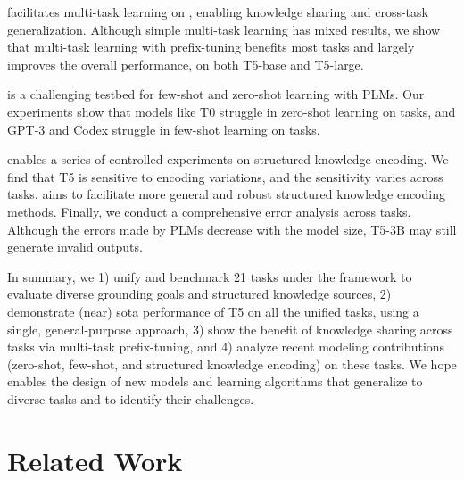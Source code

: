 \uskg facilitates multi-task learning on \skg, enabling knowledge sharing and cross-task generalization. 
Although simple multi-task learning has mixed results, we show that multi-task learning with prefix-tuning \citep{li2021prefixtuning} benefits most tasks and largely improves the overall performance, on both T5-base and T5-large.

\uskg is a challenging testbed for few-shot \cite{brown2020language,Ye2021CrossFitAF} and zero-shot learning \cite{Zhong2021AdaptingLM,Jason2021,sanh2021multitask} with PLMs.
Our experiments show that models like T0 \cite{sanh2021multitask} struggle in zero-shot learning on \skg tasks, and GPT-3 \cite{brown2020language} and Codex \cite{chen2021evaluating} struggle in few-shot learning on \skg tasks.

\uskg enables a series of controlled experiments on structured knowledge encoding.
We find that T5 is sensitive to encoding variations, and the sensitivity varies across tasks.
\uskg aims to facilitate more general and robust structured knowledge encoding methods. 
Finally, we conduct a comprehensive error analysis across \skg tasks.
Although the errors made by PLMs decrease with the model size, T5-3B may still generate invalid outputs. 

In summary, we 1) unify and benchmark 21 \skg tasks under the \uskg framework to evaluate diverse grounding goals and structured knowledge sources, 2) demonstrate (near) sota performance of T5 on all the unified \skg tasks, using a single, general-purpose approach, 3) show the benefit of knowledge sharing across \skg tasks via multi-task prefix-tuning, and 4) analyze recent modeling contributions (zero-shot, few-shot, and structured knowledge encoding) on these tasks. 
We hope \uskg enables the design of new models and learning algorithms that generalize to diverse \skg tasks and to identify their challenges.

\section{Related Work}
\label{sec:related-work}

